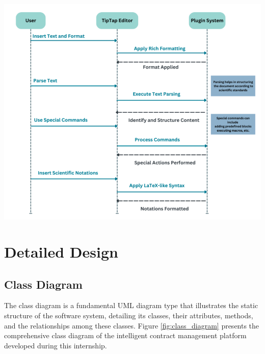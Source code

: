 \begin{center}
    \centering
    \includegraphics[width=1\textwidth]{Images/Tiptap Editing Framework.png}
    \label{fig:tiptap_legal_framework}
\end{center}


\section{Detailed Design}

\subsection{Class Diagram}
The class diagram is a fundamental UML diagram type that illustrates the static structure of the software system, detailing its classes, their attributes, methods, and the relationships among these classes. Figure \ref{fig:class_diagram} presents the comprehensive class diagram of the intelligent contract management platform developed during this internship.

